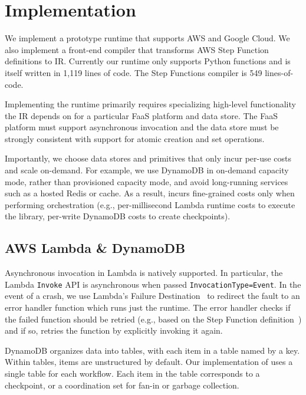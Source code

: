 \section{Implementation}\label{sec:impl}

We implement a prototype \name{} runtime that supports AWS and Google Cloud.
We also implement a front-end compiler that transforms AWS Step Function
definitions to \name{} IR. Currently our runtime only supports Python
functions and is itself written in 1,119 lines of code. The Step Functions
compiler is 549 lines-of-code.

Implementing the runtime primarily requires specializing high-level
functionality the IR depends on for a particular FaaS platform and data store.
The FaaS platform must support asynchronous invocation and the data store must
be strongly consistent with support for atomic creation and set operations.

Importantly, we choose data stores and primitives that only incur per-use
costs and scale on-demand. For example, we use DynamoDB in on-demand capacity
mode, rather than provisioned capacity mode, and avoid long-running services
such as a hosted Redis or cache. As a result, \name{} incurs fine-grained
costs only when performing orchestration (e.g., per-millisecond Lambda runtime
costs to execute the \name{} library, per-write DynamoDB costs to create
checkpoints).

\subsection{AWS Lambda \& DynamoDB}

Asynchronous invocation in Lambda is natively supported. In particular, the
Lambda \texttt{Invoke} API is asynchronous when passed
\texttt{InvocationType=Event}. In the event of a crash, we use Lambda's
Failure Destination~\cite{aws-lambda-failure-destination} to redirect the
fault to an error handler function which runs just the \name{} runtime. The
error handler checks if the failed function should be retried (e.g., based on
the Step Function definition~\cite{aws-step-functions-retry}) and if so,
retries the function by explicitly invoking it again.

DynamoDB organizes data into tables, with each item in a table named by a key.
Within tables, items are unstructured by default. Our implementation of
\name{} uses a single table for each workflow. Each item in the table
corresponds to a checkpoint, or a coordination set for fan-in or garbage
collection.

